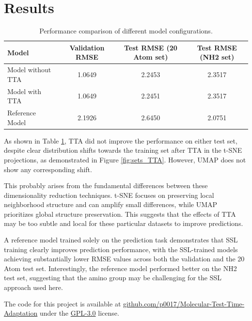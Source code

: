 \documentclass[11pt,a4paper]{article}
\begin{document}
\section{Results}

\begin{table}[htbp]
        \centering
        \begin{tabular}{@{}lccc@{}}
                \toprule
                \textbf{Model}    & \textbf{Validation RMSE} & \textbf{Test RMSE (20 Atom set)} & \textbf{Test RMSE (NH2 set)} \\
                \midrule
                Model without TTA & 1.0649                   & 2.2453                           & 2.3517                       \\
                Model with TTA    & 1.0649                   & 2.2451                           & 2.3517                       \\
                Reference Model   & 2.1926                   & 2.6450                           & 2.0751                       \\
                \bottomrule
        \end{tabular}
        \caption{Performance comparison of different model configurations.}
        \label{tab:results}
\end{table}

As shown in Table \ref{tab:results}, TTA did not improve the performance on either test set, despite clear distribution shifts towards the training set after TTA in the t-SNE projections, as demonstrated in Figure \ref{fig:sets_TTA}. However, UMAP does not show any corresponding shift.

This probably arises from the fundamental differences between these dimensionality reduction techniques. t-SNE focuses on preserving local neighborhood structure and can amplify small differences, while UMAP prioritizes global structure preservation. This suggests that the effects of TTA may be too subtle and local for these particular datasets to improve predictions.

A reference model trained solely on the prediction task demonstrates that SSL training clearly improves prediction performance, with the SSL-trained models achieving substantially lower RMSE values across both the validation and the 20 Atom test set. Interestingly, the reference model performed better on the NH2 test set, suggesting that the amino group may be challenging for the SSL approach used here.

The code for this project is available at \href{https://github.com/p0017/Molecular-Test-Time-Adaptation}{github.com/p0017/Molecular-Test-Time-Adaptation} under the \href{https://www.gnu.org/licenses/gpl-3.0}{GPL-3.0} license.
\end{document}
